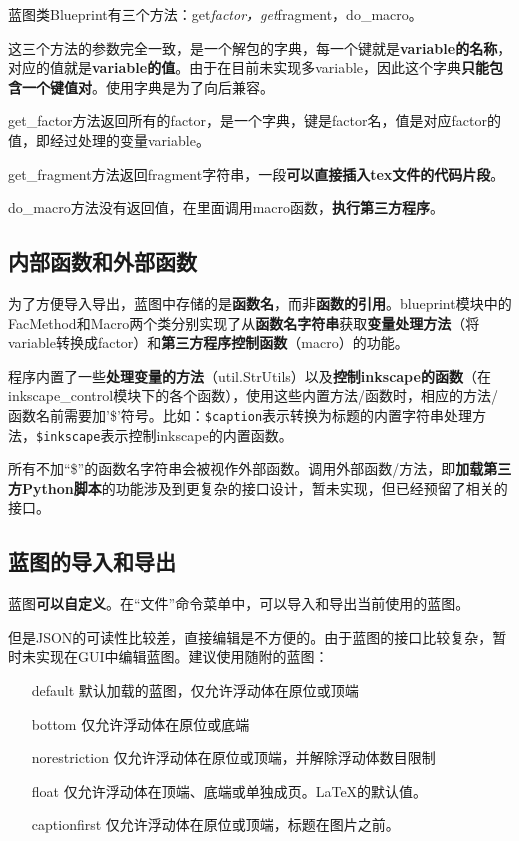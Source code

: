 \documentclass[AutoFakeBold,letterpaper,12pt,hidelinks]{article}
\begin{document}
蓝图类Blueprint有三个方法：get\emph{factor，get}fragment，do\_macro。

这三个方法的参数完全一致，是一个解包的字典，每一个键就是\textbf{variable的名称}，对应的值就是\textbf{variable的值}。由于在目前未实现多variable，因此这个字典\textbf{只能包含一个键值对}。使用字典是为了向后兼容。

get\_factor方法返回所有的factor，是一个字典，键是factor名，值是对应factor的值，即经过处理的变量variable。

get\_fragment方法返回fragment字符串，一段\textbf{可以直接插入tex文件的代码片段}。

do\_macro方法没有返回值，在里面调用macro函数，\textbf{执行第三方程序}。

\subsection{内部函数和外部函数}

为了方便导入导出，蓝图中存储的是\textbf{函数名}，而非\textbf{函数的引用}。blueprint模块中的FacMethod和Macro两个类分别实现了从\textbf{函数名字符串}获取\textbf{变量处理方法}（将variable转换成factor）和\textbf{第三方程序控制函数}（macro）的功能。

程序内置了一些\textbf{处理变量的方法}（util.StrUtils）以及\textbf{控制inkscape的函数}（在inkscape\_control模块下的各个函数），使用这些内置方法/函数时，相应的方法/函数名前需要加'\$'符号。比如：\texttt{\$caption}表示转换为标题的内置字符串处理方法，\texttt{\$inkscape}表示控制inkscape的内置函数。

所有不加``\$''的函数名字符串会被视作外部函数。调用外部函数/方法，即\textbf{加载第三方Python脚本}的功能涉及到更复杂的接口设计，暂未实现，但已经预留了相关的接口。

\subsection{蓝图的导入和导出}

蓝图\textbf{可以自定义}。在“文件”命令菜单中，可以导入和导出当前使用的蓝图。

但是JSON的可读性比较差，直接编辑是不方便的。由于蓝图的接口比较复杂，暂时未实现在GUI中编辑蓝图。建议使用随附的蓝图：

\begin{enumerate}
    \item[default] 默认加载的蓝图，仅允许浮动体在原位或顶端
    \item[bottom] 仅允许浮动体在原位或底端
    \item[norestriction] 仅允许浮动体在原位或顶端，并解除浮动体数目限制
    \item[float] 仅允许浮动体在顶端、底端或单独成页。LaTeX的默认值。
    \item[captionfirst] 仅允许浮动体在原位或顶端，标题在图片之前。 
\end{enumerate}
\end{document}

